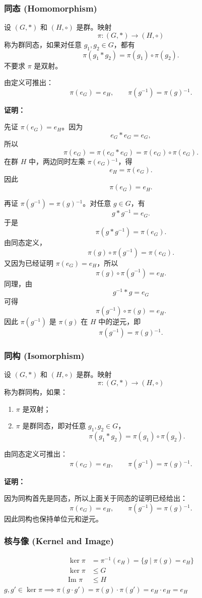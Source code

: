 \documentclass[12pt, a4paper]{article}
\begin{document}
\subsubsection*{同态 (Homomorphism)}
设 $(G,*)$ 和 $(H,\circ)$ 是群。映射
\[
\pi: (G,*) \to (H,\circ)
\]
称为群同态，如果对任意 $g_1,g_2\in G$，都有
\[
\pi(g_1 * g_2)=\pi(g_1)\circ \pi(g_2).
\]
不要求 $\pi$ 是双射。

由定义可推出：
\[
\pi(e_G)=e_H,\qquad \pi(g^{-1})=\pi(g){}^{-1}.
\]

\textbf{证明：}

先证 $\pi(e_G)=e_H$。因为
\[
e_G * e_G=e_G,
\]
所以
\[
\pi(e_G)=\pi(e_G * e_G)=\pi(e_G)\circ \pi(e_G).
\]
在群 $H$ 中，两边同时左乘 $\pi(e_G){}^{-1}$，得
\[
e_H=\pi(e_G).
\]
因此
\[
\pi(e_G)=e_H.
\]

再证 $\pi(g^{-1})=\pi(g){}^{-1}$。对任意 $g\in G$，有
\[
g*g^{-1}=e_G.
\]
于是
\[
\pi(g*g^{-1})=\pi(e_G).
\]
由同态定义，
\[
\pi(g)\circ \pi(g^{-1})=\pi(e_G).
\]
又因为已经证明 $\pi(e_G)=e_H$，所以
\[
\pi(g)\circ \pi(g^{-1})=e_H.
\]
同理，由
\[
g^{-1}*g=e_G
\]
可得
\[
\pi(g^{-1})\circ \pi(g)=e_H.
\]
因此 $\pi(g^{-1})$ 是 $\pi(g)$ 在 $H$ 中的逆元，即
\[
\pi(g^{-1})=\pi(g){}^{-1}.
\]

\subsubsection*{同构 (Isomorphism)}
设 $(G,*)$ 和 $(H,\circ)$ 是群。映射
\[
\pi: (G,*) \to (H,\circ)
\]
称为群同构，如果：
\begin{enumerate}
    \item $\pi$ 是双射；
    \item $\pi$ 是群同态，即对任意 $g_1,g_2\in G$，
    \[
    \pi(g_1 * g_2)=\pi(g_1)\circ \pi(g_2).
    \]
\end{enumerate}

由同态定义可推出：
\[
\pi(e_G)=e_H,\qquad \pi(g^{-1})=\pi(g){}^{-1}.
\]

\textbf{证明：}

因为同构首先是同态，所以上面关于同态的证明已经给出：
\[
\pi(e_G)=e_H,\qquad \pi(g^{-1})=\pi(g){}^{-1}.
\]
因此同构也保持单位元和逆元。

\subsubsection*{核与像 (Kernel and Image)}
\begin{align*}
    \ker \pi &= \pi^{-1}(e_H) = \{g \mid \pi(g) = e_H\} \\
    \ker \pi &\leq G \\
    \text{Im } \pi &\leq H
\end{align*}
$g, g' \in \ker \pi \implies \pi(g \cdot g') = \pi(g) \cdot \pi(g') = e_H \cdot e_H = e_H$
\end{document}
